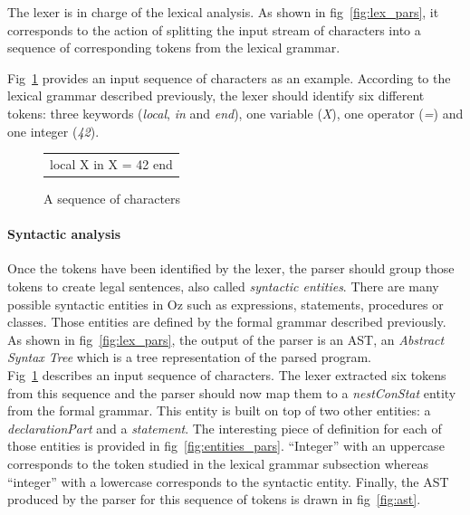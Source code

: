 \documentclass[11pt,a4paper,twoside,openright]{report}
\begin{document}
The lexer is in charge of the lexical analysis. As shown in 
fig~\ref{fig:lex_pars}, it corresponds to the action of splitting the input 
stream of characters into a sequence of corresponding tokens from the lexical 
grammar.\\
\newpage

Fig~\ref{fig:input_char} provides an input sequence of characters as an example. 
According to the lexical grammar described previously, the lexer should 
identify 
six different tokens: three keywords (\textit{local}, \textit{in} and 
\textit{end}), one variable (\textit{X}), one operator (\textit{=}) and 
one integer (\textit{42}).

\begin{figure}[ht!]
  \centering
  \begin{tabular}{l}
  local X in X = 42 end
  \end{tabular}
  \caption{A sequence of characters}
  \label{fig:input_char}
\end{figure}

\paragraph{Syntactic analysis}

Once the tokens have been identified by the lexer, the parser should 
group those tokens to create legal sentences, also called \textit{syntactic 
entities}. There are many possible syntactic entities in Oz such as 
expressions, statements, procedures or classes. Those entities are 
defined by the formal grammar described previously. As shown in 
fig~\ref{fig:lex_pars}, the output of the parser is an AST, an \textit{Abstract 
Syntax Tree} which is a tree representation of the parsed program.\\

Fig~\ref{fig:input_char} describes an input sequence of characters. The lexer 
extracted six tokens from this sequence and the parser should now map them to a 
\textit{nestConStat} entity from the formal grammar. This entity is built on 
top of two other entities: a \textit{declarationPart} and a 
\textit{statement}. The interesting piece of definition for each of those 
entities is provided in fig~\ref{fig:entities_pars}. \enquote{Integer} with an 
uppercase corresponds to the token studied in the lexical grammar subsection 
whereas \enquote{integer} with a lowercase corresponds to the syntactic entity.
Finally, the AST produced by the parser for this sequence of tokens is drawn 
in fig~\ref{fig:ast}.
\end{document}

